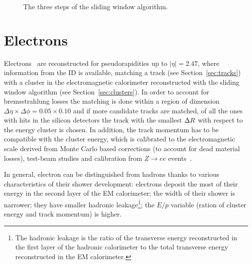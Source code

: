 \begin{figure}[tb]\begin{center}
	\caption{The three steps of the sliding window algorithm.
	\label{fig:sliding}}
\end{center}\end{figure}

\section{Electrons}\label{sec:electrons}

Electrons~\cite{eperf} are reconstructed for pseudorapidities up to $|\eta| = 2.47$, where
information from the ID is available, matching a track (see Section~\ref{sec:tracks}) 
with a cluster in the electromagnetic calorimeter reconstructed with the sliding window 
algorithm (see Section~\ref{sec:clusters}).
In order to account for bremsstrahlung losses the matching is done within a region
of dimension $\Delta\eta\times\Delta\phi=0.05\times0.10$ and if more candidate
tracks are matched, of all the ones with hits in the silicon detectors
the track with the smallest $\dr$ with respect to the
energy cluster is chosen. In addition, the track momentum has to be compatible
with the cluster energy, which is calibrated to the electromagnetic scale
derived from Monte Carlo based corrections (to account for dead material losses),
test-beam studies and calibration from $Z\to ee$ events~\cite{Abat:1900zz,AAA103104}.

In general, electron can be distinguished from hadrons thanks to various characteristics
of their shower development: electrons deposit the most of their energy in the second layer of
the EM calorimeter; the width of their shower is narrower; they have smaller
hadronic leakage\footnote{The hadronic leakage is the ratio of the transverse energy reconstructed
in the first layer of the hadronic calorimeter to the total  transverse energy reconstructed in the 
EM calorimeter.}; the $E/p$ variable (ration of cluster energy and track momentum) is higher.

